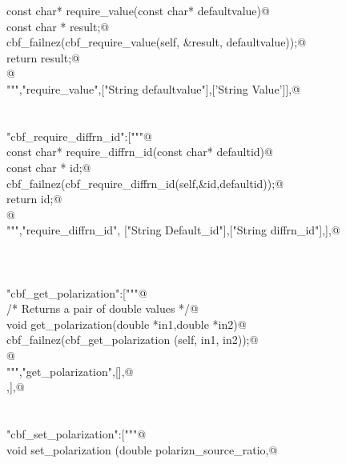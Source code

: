\documentclass[10pt,a4paper,twoside,notitlepage]{article}
\begin{document}
\begin{flushleft}
\begin{list}{}{}
\mbox{}\verb@   const char* require_value(const char* defaultvalue){@\\
\mbox{}\verb@     const char * result;@\\
\mbox{}\verb@     cbf_failnez(cbf_require_value(self, &result, defaultvalue));@\\
\mbox{}\verb@     return result;@\\
\mbox{}\verb@    }@\\
\mbox{}\verb@""","require_value",["String defaultvalue"],['String Value']],@\\
\mbox{}\verb@@\\
\mbox{}\verb@@\\
\mbox{}\verb@"cbf_require_diffrn_id":["""@\\
\mbox{}\verb@   const char* require_diffrn_id(const char* defaultid){@\\
\mbox{}\verb@     const char * id;@\\
\mbox{}\verb@     cbf_failnez(cbf_require_diffrn_id(self,&id,defaultid));@\\
\mbox{}\verb@     return id;@\\
\mbox{}\verb@     }@\\
\mbox{}\verb@""","require_diffrn_id", ["String Default_id"],["String diffrn_id"],],@\\
\mbox{}\verb@@\\
\mbox{}\verb@@\\
\mbox{}\verb@@\\
\mbox{}\verb@"cbf_get_polarization":["""@\\
\mbox{}\verb@     /* Returns a pair of double values */@\\
\mbox{}\verb@%apply double *OUTPUT { double *in1, double *in2 };@\\
\mbox{}\verb@     void get_polarization(double *in1,double *in2){@\\
\mbox{}\verb@        cbf_failnez(cbf_get_polarization (self, in1, in2));@\\
\mbox{}\verb@     }@\\
\mbox{}\verb@""","get_polarization",[],@\\
\mbox{},],@\\
\mbox{}\verb@@\\
\mbox{}\verb@@\\
\mbox{}\verb@"cbf_set_polarization":["""@\\
\mbox{}\verb@     void set_polarization (double polarizn_source_ratio,@\\

\end{list}
\end{flushleft}
\end{document}
